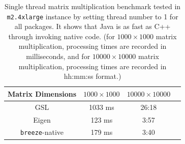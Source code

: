 \begin{table}[h!]
\begin{center}
\begin{tabular}{|c||c|c|c||}
\hline
Matrix Dimensions & $1000\times1000$ & $10000\times10000$ \\
\hline
\hline
GSL &1033 ms &26:18  \\
Eigen &123 ms  &3:57\\
\texttt{breeze}-native &179 ms  &3:40\\
\hline
\end{tabular}
\caption{Single thread matrix multiplication benchmark tested in
  \texttt{m2.4xlarge} instance by setting thread number  to 1 for all
  packages. It shows that
  Java is as fast as C++ through invoking native code. (for
  $1000\times1000$ matrix multiplication, processing times are recorded in
  milliseconds, and for $10000\times10000$ matrix multiplication, processing times are
  recorded in hh:mm:ss format.)}
\label{fig:matrixMult}
\end{center}
\end{table}
